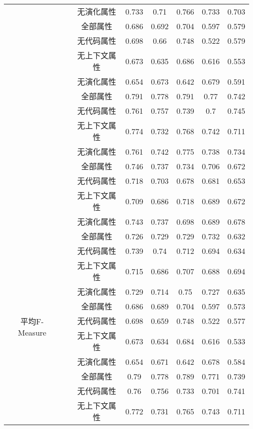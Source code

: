 \begin{table} [htbp]
\begin{tabular}{cccccccc}
&&无演化属性& 0.733    & 0.71   & 0.766 & 0.733 & 0.703 \\
\cline{2-8}
&~\multirow{4}{*}{jEdit}
&全部属性     & 0.686    & 0.692  & 0.704 & 0.597 & 0.579 \\
&&无代码属性  & 0.698    & 0.66   & 0.748 & 0.522 & 0.579 \\
&&无上下文属性  & 0.673    & 0.635  & 0.686 & 0.616 & 0.553 \\
&&无演化属性& 0.654    & 0.673  & 0.642 & 0.679 & 0.591 \\
\cline{2-8}
&~\multirow{4}{*}{jFreeChart} 
&全部属性     & 0.791    & 0.778  & 0.791 & 0.77  & 0.742 \\
&&无代码属性  & 0.761    & 0.757  & 0.739 & 0.7   & 0.745 \\
&&无上下文属性  & 0.774    & 0.732  & 0.768 & 0.742 & 0.711 \\
&&无演化属性& 0.761    & 0.742  & 0.775 & 0.738 & 0.734 \\
\cline{2-8}
&~\multirow{4}{*}{Tuxguitar} 
&全部属性   & 0.746    & 0.737  & 0.734 & 0.706 & 0.672 \\
&&无代码属性  & 0.718    & 0.703  & 0.678 & 0.681 & 0.653 \\
&&无上下文属性  & 0.709    & 0.686  & 0.718 & 0.689 & 0.672 \\
&&无演化属性& 0.743    & 0.737  & 0.698 & 0.689 & 0.678 \\
\hline
\multirow{16}{*}{平均F-Measure }
&~\multirow{4}{*}{ArgoUML}
&全部属性     & 0.726    & 0.729  & 0.729 & 0.732 & 0.632 \\
&&无代码属性& 0.739    & 0.74   & 0.712 & 0.694 & 0.634 \\
&&无上下文属性   & 0.715    & 0.686  & 0.707 & 0.688 & 0.694 \\
&&无演化属性& 0.729    & 0.714  & 0.75  & 0.727 & 0.635 \\
\cline{2-8}
&~\multirow{4}{*}{jEdit} 
&全部属性      & 0.686    & 0.689  & 0.704 & 0.597 & 0.573 \\
&&无代码属性 & 0.698    & 0.659  & 0.748 & 0.522 & 0.577 \\
&&无上下文属性   & 0.673    & 0.634  & 0.684 & 0.616 & 0.533 \\
&&无演化属性& 0.654    & 0.671  & 0.642 & 0.678 & 0.584 \\
\cline{2-8}
&~\multirow{4}{*}{jFreeChart} 
&全部属性      & 0.79     & 0.778  & 0.789 & 0.771 & 0.739 \\
&&无代码属性 & 0.76     & 0.756  & 0.733 & 0.701 & 0.741 \\
&&无上下文属性   & 0.772    & 0.731  & 0.765 & 0.743 & 0.711 \\

\end{tabular}
\end{table}
